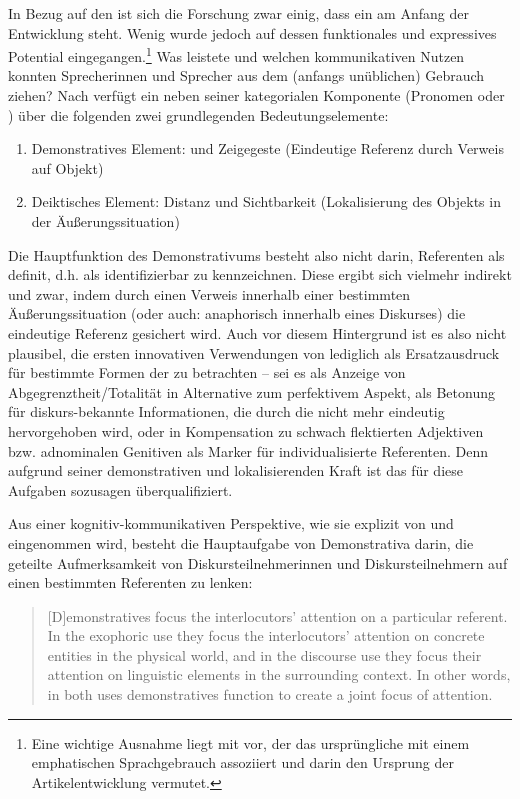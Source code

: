 In Bezug auf den  ist sich die Forschung zwar einig, dass ein  am Anfang der Entwicklung steht. Wenig wurde jedoch auf dessen funktionales und expressives Potential eingegangen.\footnote{Eine wichtige Ausnahme liegt mit \textcite[16--17]{Hodler1954} vor, der das ursprüngliche  mit einem emphatischen Sprachgebrauch assoziiert und darin den Ursprung der Artikelentwicklung vermutet.} Was leistete  und welchen kommunikativen Nutzen konnten Sprecherinnen und Sprecher aus dem (anfangs unüblichen) Gebrauch ziehen? Nach \textcite[40]{Lehmann2015} verfügt ein  neben seiner kategorialen Komponente (Pronomen oder ) über die folgenden zwei grundlegenden Bedeutungselemente:

\begin{enumerate}
\item Demonstratives Element:  und Zeigegeste (Eindeutige Referenz durch  Verweis auf Objekt)  
\item Deiktisches Element:  Distanz und Sichtbarkeit (Lokalisierung des Objekts in der Äußerungssituation)
\end{enumerate}
\noindent
Die Hauptfunktion des Demonstrativums  besteht also  nicht darin, Referenten als definit, d.h. als identifizierbar zu kennzeichnen. Diese ergibt sich vielmehr indirekt und zwar, indem durch einen Verweis innerhalb einer bestimmten Äußerungssituation (oder auch: anaphorisch  innerhalb eines Diskurses) die eindeutige Referenz  gesichert wird. Auch vor diesem Hintergrund ist es also nicht plausibel, die ersten innovativen Verwendungen von  lediglich als Ersatzausdruck für bestimmte Formen der  zu betrachten -- sei es als Anzeige von Abgegrenztheit/Totalität in Alternative zum perfektivem  Aspekt, als Betonung für diskurs-bekannte Informationen, die durch die  nicht mehr eindeutig hervorgehoben wird, oder in Kompensation zu schwach flektierten Adjektiven   bzw. adnominalen Genitiven  als Marker für individualisierte  Referenten. Denn aufgrund seiner demonstrativen und lokalisierenden Kraft ist das  für diese Aufgaben sozusagen überqualifiziert. 

Aus einer kognitiv-kommunikativen Perspektive, wie sie explizit von \textcite{Epstein1993,Epstein1994} und \textcite{Diessel2006} eingenommen wird, besteht die Hauptaufgabe von Demonstrativa  darin, die geteilte Aufmerksamkeit von Diskursteilnehmerinnen und Diskursteilnehmern auf einen bestimmten Referenten zu lenken: \blockcquote[476]{Diessel2006}{[D]emonstratives
focus the interlocutors’ attention on a particular referent. In the
exophoric use they focus the interlocutors’ attention on concrete entities
in the physical world, and in the discourse use they focus their attention
on linguistic elements in the surrounding context. In other words, in both
uses demonstratives function to create a joint focus of attention.}

